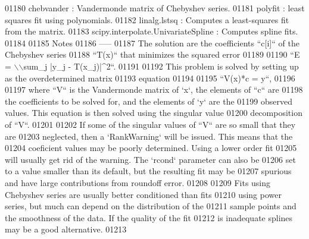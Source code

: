 \begin{DoxyCode}
01180 \textcolor{stringliteral}{    chebvander : Vandermonde matrix of Chebyshev series.}
01181 \textcolor{stringliteral}{    polyfit : least squares fit using polynomials.}
01182 \textcolor{stringliteral}{    linalg.lstsq : Computes a least-squares fit from the matrix.}
01183 \textcolor{stringliteral}{    scipy.interpolate.UnivariateSpline : Computes spline fits.}
01184 \textcolor{stringliteral}{}
01185 \textcolor{stringliteral}{    Notes}
01186 \textcolor{stringliteral}{    -----}
01187 \textcolor{stringliteral}{    The solution are the coefficients ``c[i]`` of the Chebyshev series}
01188 \textcolor{stringliteral}{    ``T(x)`` that minimizes the squared error}
01189 \textcolor{stringliteral}{}
01190 \textcolor{stringliteral}{    ``E = \(\backslash\)\(\backslash\)sum\_j |y\_j - T(x\_j)|^2``.}
01191 \textcolor{stringliteral}{}
01192 \textcolor{stringliteral}{    This problem is solved by setting up as the overdetermined matrix}
01193 \textcolor{stringliteral}{    equation}
01194 \textcolor{stringliteral}{}
01195 \textcolor{stringliteral}{    ``V(x)*c = y``,}
01196 \textcolor{stringliteral}{}
01197 \textcolor{stringliteral}{    where ``V`` is the Vandermonde matrix of `x`, the elements of ``c`` are}
01198 \textcolor{stringliteral}{    the coefficients to be solved for, and the elements of `y` are the}
01199 \textcolor{stringliteral}{    observed values.  This equation is then solved using the singular value}
01200 \textcolor{stringliteral}{    decomposition of ``V``.}
01201 \textcolor{stringliteral}{}
01202 \textcolor{stringliteral}{    If some of the singular values of ``V`` are so small that they are}
01203 \textcolor{stringliteral}{    neglected, then a `RankWarning` will be issued. This means that the}
01204 \textcolor{stringliteral}{    coeficient values may be poorly determined. Using a lower order fit}
01205 \textcolor{stringliteral}{    will usually get rid of the warning.  The `rcond` parameter can also be}
01206 \textcolor{stringliteral}{    set to a value smaller than its default, but the resulting fit may be}
01207 \textcolor{stringliteral}{    spurious and have large contributions from roundoff error.}
01208 \textcolor{stringliteral}{}
01209 \textcolor{stringliteral}{    Fits using Chebyshev series are usually better conditioned than fits}
01210 \textcolor{stringliteral}{    using power series, but much can depend on the distribution of the}
01211 \textcolor{stringliteral}{    sample points and the smoothness of the data. If the quality of the fit}
01212 \textcolor{stringliteral}{    is inadequate splines may be a good alternative.}
01213 \textcolor{stringliteral}{}

\end{DoxyCode}
